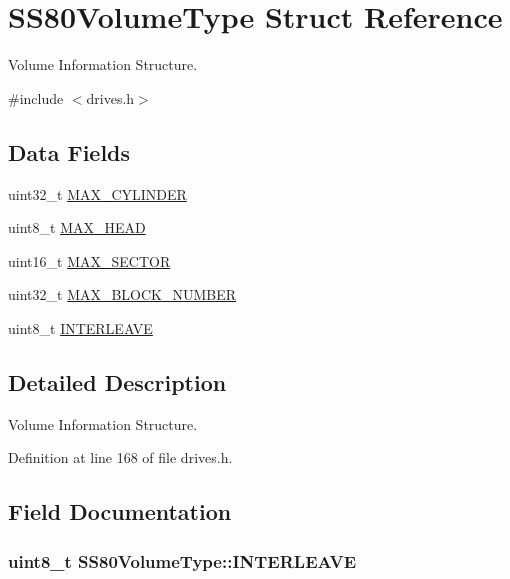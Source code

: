 \hypertarget{structSS80VolumeType}{}\section{S\+S80\+Volume\+Type Struct Reference}
\label{structSS80VolumeType}


Volume Information Structure.  




{\ttfamily \#include $<$drives.\+h$>$}

\subsection*{Data Fields}
\begin{DoxyCompactItemize}
\item 
uint32\+\_\+t \hyperlink{structSS80VolumeType_a53b65739246cea4e0d9095c88b03be8e}{M\+A\+X\+\_\+\+C\+Y\+L\+I\+N\+D\+ER}
\item 
uint8\+\_\+t \hyperlink{structSS80VolumeType_acc2870eb0a52a0e7f4dc57f036d903b1}{M\+A\+X\+\_\+\+H\+E\+AD}
\item 
uint16\+\_\+t \hyperlink{structSS80VolumeType_a0a367b3bf05801cdee9dadc8324a3bdb}{M\+A\+X\+\_\+\+S\+E\+C\+T\+OR}
\item 
uint32\+\_\+t \hyperlink{structSS80VolumeType_afe3db69c9ec54fa6d9fd48f3e6e9097b}{M\+A\+X\+\_\+\+B\+L\+O\+C\+K\+\_\+\+N\+U\+M\+B\+ER}
\item 
uint8\+\_\+t \hyperlink{structSS80VolumeType_accc9f011ff8edebcc6d781d1aa51f16d}{I\+N\+T\+E\+R\+L\+E\+A\+VE}
\end{DoxyCompactItemize}


\subsection{Detailed Description}
Volume Information Structure. 

Definition at line 168 of file drives.\+h.



\subsection{Field Documentation}
\subsubsection[{\texorpdfstring{I\+N\+T\+E\+R\+L\+E\+A\+VE}{INTERLEAVE}}]{\setlength{\rightskip}{0pt plus 5cm}uint8\+\_\+t S\+S80\+Volume\+Type\+::\+I\+N\+T\+E\+R\+L\+E\+A\+VE}\hypertarget{structSS80VolumeType_accc9f011ff8edebcc6d781d1aa51f16d}{}\label{structSS80VolumeType_accc9f011ff8edebcc6d781d1aa51f16d}


